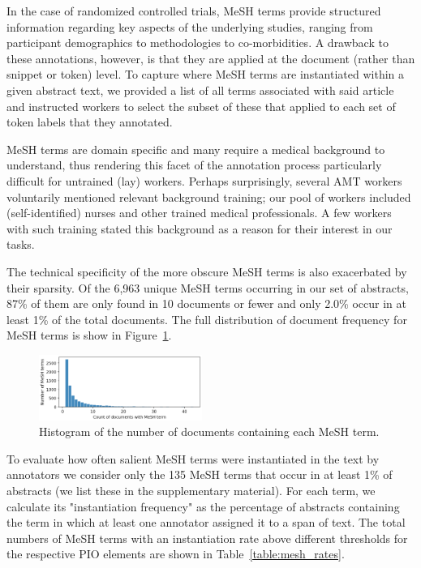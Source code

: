 \documentclass[11pt,a4paper]{article}
\begin{document}
In the case of randomized controlled trials, MeSH terms provide structured information regarding key aspects of the underlying studies, ranging from participant demographics to methodologies to co-morbidities. A drawback to these annotations, however, is that they are applied at the document (rather than snippet or token) level. To capture where MeSH terms are instantiated within a given abstract text, we provided a list of all terms associated with said article and instructed workers to select the subset of these that applied to each set of token labels that they annotated.

MeSH terms are domain specific and many require a medical background to understand, thus rendering this facet of the annotation process particularly difficult for untrained (lay) workers.
Perhaps surprisingly, several AMT workers voluntarily mentioned relevant background training; our pool of workers included (self-identified) nurses and other trained medical professionals. A few workers with such training stated this background as a reason for their interest in our tasks. %

The technical specificity of the more obscure MeSH terms is also exacerbated by their sparsity.
Of the 6,963 unique MeSH terms occurring in our set of abstracts, 87\% of them are only found in 10 documents or fewer and only 2.0\% occur in at least 1\% of the total documents.
The full distribution of document frequency for MeSH terms is show in Figure~\ref{fig:mesh_freq}.

\begin{figure}
\centering
\includegraphics[width=0.475\textwidth]{figs/mesh_freq.png}
\caption{Histogram of the number of documents containing each MeSH term.}
\label{fig:mesh_freq}
\end{figure}

To evaluate how often salient MeSH terms were instantiated in the text by annotators we consider only the 135 MeSH terms that occur in at least 1\% of abstracts (we list these in the supplementary material).
For each term, we calculate its "instantiation frequency" as the percentage of abstracts containing the term in which at least one annotator assigned it to a span of text.
The total numbers of MeSH terms with an instantiation rate above different thresholds for the respective PIO elements are shown in Table~\ref{table:mesh_rates}.
\end{document}
